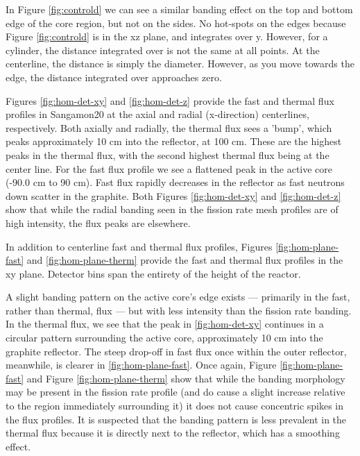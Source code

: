 In Figure \ref{fig:controld} we can see a similar banding effect on the top and bottom edge of the core region, but not on the sides.  No hot-spots on the edges because Figure \ref{fig:controld} is in the xz plane, and integrates over y.  However, for a cylinder, the distance integrated over is not the same at all points.  At the centerline, the distance is simply the diameter.  However, as you move towards the edge, the distance integrated over approaches zero.




Figures \ref{fig:hom-det-xy} and \ref{fig:hom-det-z} provide the fast and thermal flux profiles in Sangamon20 at the axial and radial (x-direction) centerlines, respectively.  Both axially and radially, the thermal flux sees a 'bump', which peaks approximately 10 cm into the reflector, at 100 cm.  These are the highest peaks in the thermal flux, with the second highest thermal flux being at the center line.  For the fast flux profile we see a flattened peak in the  active core (-90.0 cm to 90 cm).  Fast flux rapidly decreases in the reflector as fast neutrons down scatter in the graphite.  Both Figures \ref{fig:hom-det-xy} and \ref{fig:hom-det-z} show that while the radial banding seen in the fission rate mesh profiles are of high intensity, the flux peaks are elsewhere.

In addition to centerline fast and thermal flux profiles, Figures \ref{fig:hom-plane-fast} and \ref{fig:hom-plane-therm} provide the fast and thermal flux profiles in the xy plane.  Detector bins span the entirety of the height of the reactor.



A slight banding pattern on the active core's edge exists --- primarily in the fast, rather than thermal, flux --- but with less intensity than the fission rate banding.  In the thermal flux, we see that the peak in \ref{fig:hom-det-xy} continues in a circular pattern surrounding the active core, approximately 10 cm into the graphite reflector.  The steep drop-off in fast flux once within the outer reflector, meanwhile, is clearer in \ref{fig:hom-plane-fast}.  Once again, Figure \ref{fig:hom-plane-fast} and Figure \ref{fig:hom-plane-therm} show that while the banding morphology may be present in the fission rate profile (and do cause a slight increase relative to the region immediately surrounding it) it does not cause concentric spikes in the flux profiles.  It is suspected that the banding pattern is less prevalent in the thermal flux because it is directly next to the reflector, which has a smoothing effect.

